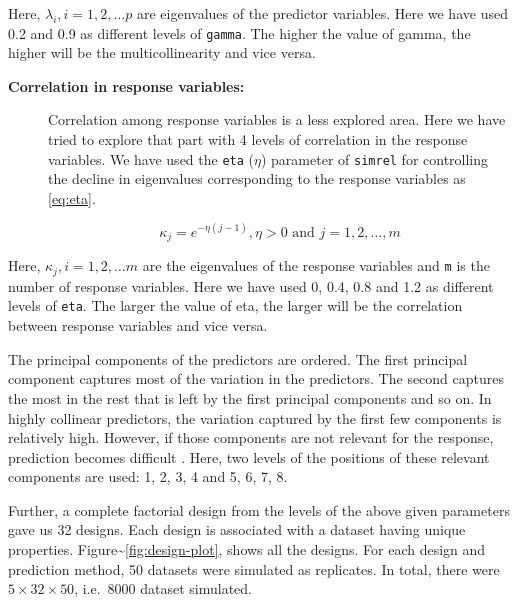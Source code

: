 \documentclass[12pt,3p,authoryear]{elsarticle}
\providecommand{\tightlist}{%
  \setlength{\itemsep}{0pt}\setlength{\parskip}{0pt}}
\begin{document}
Here, \(\lambda_i, i = 1, 2, \ldots p\) are eigenvalues of the predictor
variables. Here we have used 0.2 and 0.9 as different levels of
\texttt{gamma}. The higher the value of gamma, the higher will be the
multicollinearity and vice versa.

\begin{description}
\item[\textbf{Correlation in response variables:}]
Correlation among response variables is a less explored area. Here we
have tried to explore that part with 4 levels of correlation in the
response variables. We have used the \texttt{eta} (\(\eta\)) parameter
of \texttt{simrel} for controlling the decline in eigenvalues
corresponding to the response variables as \eqref{eq:eta}.

\begin{equation}
  \kappa_j = e^{-\eta(j - 1)}, \eta > 0 \text{ and } j = 1, 2, \ldots, m
  \label{eq:eta}
\end{equation}
\end{description}

Here, \(\kappa_j, i = 1, 2, \ldots m\) are the eigenvalues of the
response variables and \texttt{m} is the number of response variables.
Here we have used 0, 0.4, 0.8 and 1.2 as different levels of
\texttt{eta}. The larger the value of eta, the larger will be the
correlation between response variables and vice versa.

\begin{description}
\tightlist
\item[\textbf{Position of predictor components relevant to the
response:}]
The principal components of the predictors are ordered. The first
principal component captures most of the variation in the predictors.
The second captures the most in the rest that is left by the first
principal components and so on. In highly collinear predictors, the
variation captured by the first few components is relatively high.
However, if those components are not relevant for the response,
prediction becomes difficult \citep{Helland1994b}. Here, two levels of
the positions of these relevant components are used: 1, 2, 3, 4 and 5,
6, 7, 8.
\end{description}

Further, a complete factorial design from the levels of the above given
parameters gave us 32 designs. Each design is associated with a dataset
having unique properties. Figure\textasciitilde{}\ref{fig:design-plot},
shows all the designs. For each design and prediction method, 50
datasets were simulated as replicates. In total, there were
\(5 \times 32 \times 50\), i.e.~8000 dataset simulated.
\end{document}
